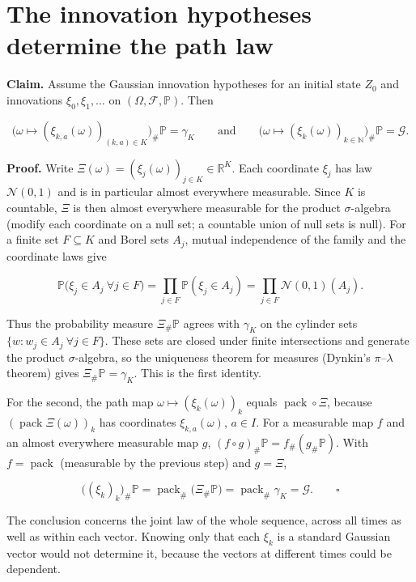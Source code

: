\documentclass[11pt,a4paper]{article}
\begin{document}
\section{\texorpdfstring{The innovation hypotheses determine the path law}{The innovation hypotheses determine the path law}}


\textbf{Claim.} Assume the Gaussian innovation hypotheses for an initial state \(Z_0\) and innovations \(\xi_0,\xi_1,\dots\) on \((\Omega,\mathcal F,\mathbb P)\). Then


\[\bigl(\omega\mapsto(\xi_{k,a}(\omega))_{(k,a)\in K}\bigr)_\#\mathbb P=\gamma_K\qquad\text{and}\qquad\bigl(\omega\mapsto(\xi_k(\omega))_{k\in\mathbb N}\bigr)_\#\mathbb P=\mathcal G .\]


\textbf{Proof.} Write \(\Xi(\omega)=(\xi_j(\omega))_{j\in K}\in\mathbb R^K\). Each coordinate \(\xi_j\) has law \(\mathcal N(0,1)\) and is in particular almost everywhere measurable. Since \(K\) is countable, \(\Xi\) is then almost everywhere measurable for the product \(\sigma\)-algebra (modify each coordinate on a null set; a countable union of null sets is null). For a finite set \(F\subseteq K\) and Borel sets \(A_j\), mutual independence of the family and the coordinate laws give


\[\mathbb P\bigl(\xi_j\in A_j\ \forall j\in F\bigr)=\prod_{j\in F}\mathbb P(\xi_j\in A_j)=\prod_{j\in F}\mathcal N(0,1)(A_j).\]


Thus the probability measure \(\Xi_\#\mathbb P\) agrees with \(\gamma_K\) on the cylinder sets \(\{w:w_j\in A_j\ \forall j\in F\}\). These sets are closed under finite intersections and generate the product \(\sigma\)-algebra, so the uniqueness theorem for measures (Dynkin's \(\pi\)–\(\lambda\) theorem) gives \(\Xi_\#\mathbb P=\gamma_K\). This is the first identity.




For the second, the path map \(\omega\mapsto(\xi_k(\omega))_k\) equals \(\operatorname{pack}\circ\Xi\), because \((\operatorname{pack}\Xi(\omega))_k\) has coordinates \(\xi_{k,a}(\omega)\), \(a\in I\). For a measurable map \(f\) and an almost everywhere measurable map \(g\), \((f\circ g)_\#\mathbb P=f_\#(g_\#\mathbb P)\). With \(f=\operatorname{pack}\) (measurable by the previous step) and \(g=\Xi\),


\[\bigl((\xi_k)_k\bigr)_\#\mathbb P=\operatorname{pack}_\#\bigl(\Xi_\#\mathbb P\bigr)=\operatorname{pack}_\#\gamma_K=\mathcal G .\qquad\square\]


The conclusion concerns the joint law of the whole sequence, across all times as well as within each vector. Knowing only that each \(\xi_k\) is a standard Gaussian vector would not determine it, because the vectors at different times could be dependent.
\end{document}
